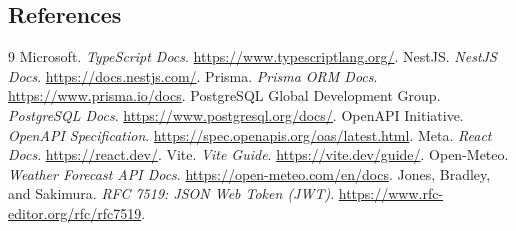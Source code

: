 \documentclass[11pt,a4paper]{article}
\begin{document}
\subsection*{References}
\begingroup
\small
\setlength{\itemsep}{1pt}
\setlength{\parskip}{0pt}
\setlength{\topsep}{2pt}
\setlength{\partopsep}{0pt}
\setlength{\parsep}{0pt}
\raggedright
\begin{thebibliography}{9}
 Microsoft. \emph{TypeScript Docs}. \url{https://www.typescriptlang.org/}.
 NestJS. \emph{NestJS Docs}. \url{https://docs.nestjs.com/}.
 Prisma. \emph{Prisma ORM Docs}. \url{https://www.prisma.io/docs}.
 PostgreSQL Global Development Group. \emph{PostgreSQL Docs}. \url{https://www.postgresql.org/docs/}.
 OpenAPI Initiative. \emph{OpenAPI Specification}. \url{https://spec.openapis.org/oas/latest.html}.
 Meta. \emph{React Docs}. \url{https://react.dev/}.
 Vite. \emph{Vite Guide}. \url{https://vite.dev/guide/}.
 Open-Meteo. \emph{Weather Forecast API Docs}. \url{https://open-meteo.com/en/docs}.
 Jones, Bradley, and Sakimura. \emph{RFC 7519: JSON Web Token (JWT)}. \url{https://www.rfc-editor.org/rfc/rfc7519}.
\end{thebibliography}
\endgroup
\end{document}
